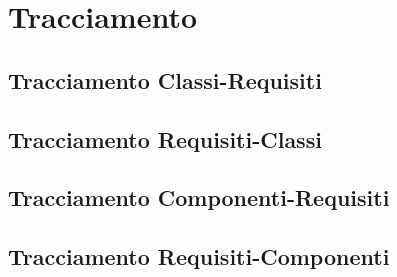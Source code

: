 \section{Tracciamento}

	\subsection{Tracciamento Classi-Requisiti}
	
	\subsection{Tracciamento Requisiti-Classi}
	
	\subsection{Tracciamento Componenti-Requisiti}
	
	\subsection{Tracciamento Requisiti-Componenti}